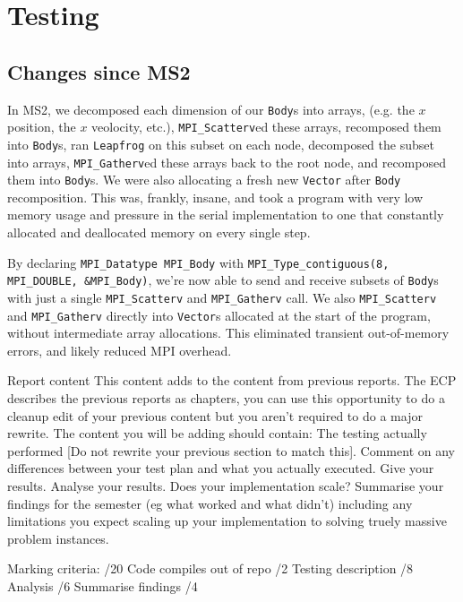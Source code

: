 \documentclass[11pt,a4paper]{article}
\begin{document}
\section*{Testing}

\subsection*{Changes since MS2}

In MS2, we decomposed each dimension of our \texttt{Body}s into arrays, (e.g. the $x$ position, the $x$ veolocity, etc.), \texttt{MPI\_Scatterv}ed these arrays, recomposed them into \texttt{Body}s, ran \texttt{Leapfrog} on this subset on each node, decomposed the subset into arrays, \texttt{MPI\_Gatherv}ed these arrays back to the root node, and recomposed them into \texttt{Body}s. We were also allocating a fresh new \texttt{Vector} after \texttt{Body} recomposition. This was, frankly, insane, and took a program with very low memory usage and pressure in the serial implementation to one that constantly allocated and deallocated memory on every single step.

By declaring \texttt{MPI\_Datatype MPI\_Body} with \texttt{MPI\_Type\_contiguous(8, MPI\_DOUBLE, \&MPI\_Body)}, we're now able to send and receive subsets of \texttt{Body}s with just a single \texttt{MPI\_Scatterv} and \texttt{MPI\_Gatherv} call. We also \texttt{MPI\_Scatterv} and \texttt{MPI\_Gatherv} directly into \texttt{Vector}s allocated at the start of the program, without intermediate array allocations. This eliminated transient out-of-memory errors, and likely reduced MPI overhead.











Report content
   This content adds to the content from previous reports.  The ECP describes the previous reports as chapters, you can use this opportunity to do a cleanup edit of your previous content but you aren't required to do a major rewrite.
The content you will be adding should contain:
    The testing actually performed [Do not rewrite your previous section to match this]. Comment on any differences between your test plan and what you actually executed. Give your results.
    Analyse your results. Does your implementation scale? 
    Summarise your findings for the semester (eg what worked and what didn't) including any limitations you expect scaling up your implementation to solving truely massive problem instances.

Marking criteria: /20
  Code compiles out of repo /2
  Testing description       /8
  Analysis                  /6
  Summarise findings        /4



\end{document}
